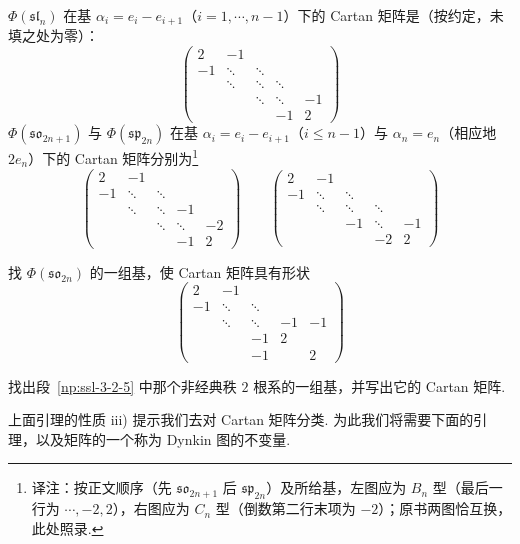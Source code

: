 \begin{example*}
$\Phi(\mathfrak{sl}_n)$ 在基 $\alpha_i=e_i-e_{i+1}$（$i=1,\cdots,n-1$）下的 Cartan 矩阵是（按约定，未填之处为零）：
\[
\begin{pmatrix}
2 & -1 & & & \\
-1 & \ddots & \ddots & & \\
 & \ddots & \ddots & \ddots & \\
 & & \ddots & \ddots & -1 \\
 & & & -1 & 2
\end{pmatrix}
\]
$\Phi(\mathfrak{so}_{2n+1})$ 与 $\Phi(\mathfrak{sp}_{2n})$ 在基 $\alpha_i=e_i-e_{i+1}$（$i\leqslant n-1$）与 $\alpha_n=e_n$（相应地 $2e_n$）下的 Cartan 矩阵分别为\footnote{译注：按正文顺序（先 $\mathfrak{so}_{2n+1}$ 后 $\mathfrak{sp}_{2n}$）及所给基，左图应为 $B_n$ 型（最后一行为 $\cdots,-2,2$），右图应为 $C_n$ 型（倒数第二行末项为 $-2$）；原书两图恰互换，此处照录.}
\[
\begin{pmatrix}
2 & -1 & & & \\
-1 & \ddots & \ddots & & \\
 & \ddots & \ddots & -1 & \\
 & & \ddots & \ddots & -2 \\
 & & & -1 & 2
\end{pmatrix}
\qquad
\begin{pmatrix}
2 & -1 & & & \\
-1 & \ddots & \ddots & & \\
 & \ddots & \ddots & \ddots & \\
 & & -1 & \ddots & -1 \\
 & & & -2 & 2
\end{pmatrix}
\]
\end{example*}
\begin{exercise*}
找 $\Phi(\mathfrak{so}_{2n})$ 的一组基，使 Cartan 矩阵具有形状
\[
\begin{pmatrix}
2 & -1 & & & \\
-1 & \ddots & \ddots & & \\
 & \ddots & \ddots & -1 & -1 \\
 & & -1 & 2 & \\
 & & -1 & & 2
\end{pmatrix}
\]
\end{exercise*}
\begin{exercise*}
找出段~\ref{np:ssl-3-2-5} 中那个非经典秩 $2$ 根系的一组基，并写出它的 Cartan 矩阵.
\end{exercise*}
上面引理的性质 iii) 提示我们去对 Cartan 矩阵分类. 为此我们将需要下面的引理，以及矩阵的一个称为 Dynkin 图的不变量.
